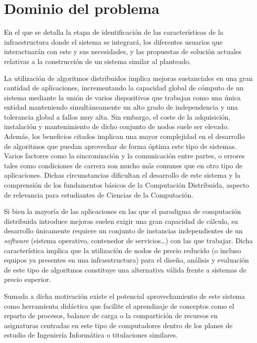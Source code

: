 \chapter{Dominio del problema}

\begin{cabstract}
En el que se detalla la etapa de identificación de las características de la infraestructura donde el sistema se integrará, los diferentes usuarios que interactuarán con este y sus necesidades, y las propuestas de solución actuales relativas a la construcción de un sistema similar al planteado.
\end{cabstract}

La utilización de algoritmos distribuidos implica mejoras sustanciales en una gran cantidad de aplicaciones, incrementando la capacidad global de cómputo de un sistema mediante la unión de varios dispositivos que trabajan como una única entidad manteniendo simultáneamente un alto grado de independencia y una tolerancia global a fallos muy alta. Sin embargo, el coste de la adquisición, instalación y mantenimiento de dicho conjunto de nodos suele ser elevado. Además, los beneficios citados implican una mayor complejidad en el desarrollo de algoritmos que puedan aprovechar de forma óptima este tipo de sistemas. Varios factores como la sincronización y la comunicación entre partes, o errores tales como condiciones de carrera son mucho más comunes que en otro tipo de aplicaciones. Dichas circunstancias dificultan el desarrollo de este sistema y la comprensión de los fundamentos básicos de la Computación Distribuida, aspecto de relevancia para estudiantes de Ciencias de la Computación.

Si bien la mayoría de las aplicaciones en las que el paradigma de computación distribuida introduce mejoras suelen exigir una gran capacidad de cálculo, su desarrollo únicamente requiere un conjunto de instancias independientes de un \textit{software} (sistema operativo, contenedor de servicios\dots) con las que trabajar. Dicha característica implica que la utilización de nodos de precio reducido (o incluso equipos ya presentes en una infraestructura) para el diseño, análisis y evaluación de este tipo de algoritmos constituye una alternativa válida frente a sistemas de precio superior.

Sumada a dicha motivación existe el potencial aprovechamiento de este sistema como herramienta didáctica que facilite el aprendizaje de conceptos como el reparto de procesos, balance de carga o la compartición de recursos en asignaturas centradas en este tipo de computadores dentro de los planes de estudio de Ingeniería Informática o titulaciones similares.

